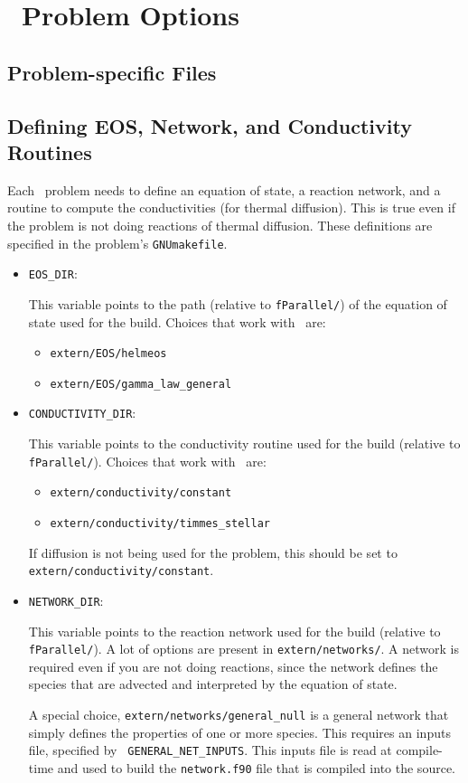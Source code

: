 \section{\maestro\ Problem Options}

\subsection{Problem-specific Files}
\label{sec:make:otherfiles}


\subsection{Defining EOS, Network, and Conductivity Routines}

Each \maestro\ problem needs to define an equation of state, a
reaction network, and a routine to compute the conductivities (for
thermal diffusion).  This is true even if the problem is not doing
reactions of thermal diffusion.  These definitions are specified
in the problem's {\tt GNUmakefile}.

\begin{itemize}
\item {\tt EOS\_DIR}:

  This variable points to the path (relative to {\tt fParallel/}) of
  the equation of state used for the build.  Choices that work
  with \maestro\ are:
  \begin{itemize}
  \item {\tt extern/EOS/helmeos}
  \item {\tt extern/EOS/gamma\_law\_general}
  \end{itemize}

\item {\tt CONDUCTIVITY\_DIR}:

  This variable points to the conductivity routine used for the build
  (relative to {\tt fParallel/}).  Choices that work with \maestro\
  are:
  \begin{itemize}
  \item {\tt extern/conductivity/constant}
  \item {\tt extern/conductivity/timmes\_stellar}
  \end{itemize}
  If diffusion is not being used for the problem, this should be set
  to {\tt extern/conductivity/constant}.

\item {\tt NETWORK\_DIR}:

  This variable points to the reaction network used for the build
  (relative to {\tt fParallel/}).  A lot of options are present in
  {\tt extern/networks/}.  A network is required even if you are not
  doing reactions, since the network defines the species that are
  advected and interpreted by the equation of state.  

  A special choice, {\tt extern/networks/general\_null} is a general
  network that simply defines the properties of one or more species.
  This requires an inputs file, specified by {\tt
  GENERAL\_NET\_INPUTS}.  This inputs file is read at compile-time and
  used to build the {\tt network.f90} file that is compiled into the
  source.

\end{itemize}


